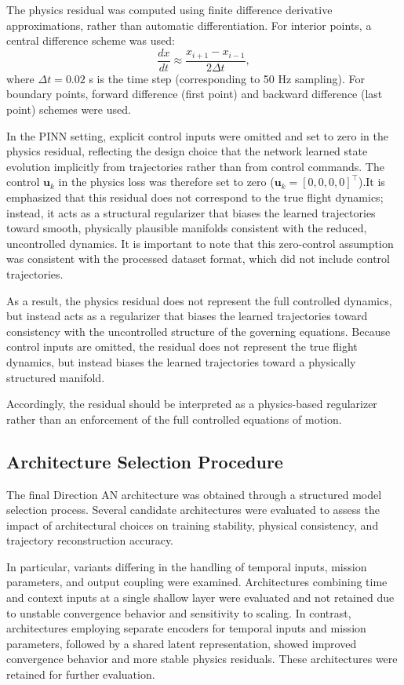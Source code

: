 The physics residual was computed using finite difference derivative
approximations, rather than automatic differentiation. For interior points, a
central difference scheme was used:
\[
  \frac{dx}{dt} \approx \frac{x_{i+1} - x_{i-1}}{2\Delta t},
\]
where \(\Delta t = 0.02\) s is the time step (corresponding to 50 Hz sampling).
For boundary points, forward difference (first point) and backward difference
(last point) schemes were used.

In the PINN setting, explicit control inputs were omitted and set to zero in the
physics residual, reflecting the design choice that the network learned state
evolution implicitly from trajectories rather than from control commands. The
control \(\mathbf{u}_k\) in the physics loss was therefore set to zero
(\(\mathbf{u}_k = [0, 0, 0, 0]^\top\)).It is emphasized that this residual does 
not correspond to the true flight dynamics; instead, it acts as a structural 
regularizer that biases the learned trajectories toward smooth, physically plausible 
manifolds consistent with the reduced, uncontrolled dynamics. It is important 
to note that this zero-control assumption was consistent with the processed dataset 
format, which did not include control trajectories.

As a result, the physics residual does not represent the full controlled dynamics, but instead acts as a regularizer that biases the learned trajectories toward consistency with the uncontrolled structure of the governing equations. Because control inputs are omitted, the residual does not represent the true flight dynamics, but instead biases the learned trajectories toward a physically structured manifold.

Accordingly, the residual should be interpreted as a physics-based regularizer rather than an enforcement of the full controlled equations of motion.

\subsection{Architecture Selection Procedure}

The final Direction AN architecture was obtained through a structured model selection 
process. Several candidate architectures were evaluated to assess the impact of 
architectural choices on training stability, physical consistency, and trajectory 
reconstruction accuracy.

In particular, variants differing in the handling of temporal inputs, mission 
parameters, and output coupling were examined. Architectures combining time and 
context inputs at a single shallow layer were evaluated and not retained due to 
unstable convergence behavior and sensitivity to scaling. In contrast, architectures 
employing separate encoders for temporal inputs and mission parameters, followed by 
a shared latent representation, showed improved convergence behavior and more 
stable physics residuals. These architectures were retained for further evaluation.

